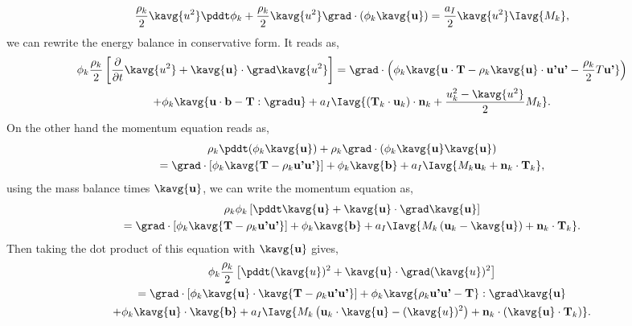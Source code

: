 \begin{equation*}
    \frac{\rho_k}{2} \kavg{u^2} \pddt \phi_k 
    + \frac{\rho_k}{2} \kavg{u^2} \grad \cdot\left(\phi_k\kavg{\textbf{u}}\right)
    = \frac{a_I}{2}\kavg{u^2}\Iavg{M_k},
\end{equation*}
we can rewrite the energy balance in conservative form. 
It reads as, 
\begin{multline}
    \phi_k\frac{\rho_k}{2}  \left[
        \frac{\partial }{\partial t}
        \kavg{u^2}
        +\kavg{\textbf{u}}\cdot\grad 
        \kavg{u^2}
    \right]
    =
    \grad\cdot\left(
        \phi_k
        \kavg{\textbf{u}\cdot \textbf{T}
        - \rho_k\kavg{\textbf{u}}\cdot\textbf{u'u'}
        - \frac{\rho_k}{2}T\textbf{u'}}
    \right)\\
    +\phi_k\kavg{\textbf{u}\cdot\textbf{b} - \textbf{T}: \grad\textbf{u}}
    +a_I \Iavg{
        (\textbf{T}_k\cdot\textbf{u}_k)\cdot\textbf{n}_k
        + \frac{u^2_k - \kavg{u^2}}{2} M_k}.
    \label{ap:eq:avg_k_u_2}
\end{multline}
On the other hand the momentum equation reads as, 
\begin{multline*}
    \rho_k\pddt (\phi_k\kavg{\textbf{u}}) 
    + \rho_k\grad\cdot(\phi_k\kavg{\textbf{u}}\kavg{\textbf{u}})\\
    = \grad\cdot\left[
        \phi_k \kavg{\textbf{T}
        - \rho_k \textbf{u'u'}}
    \right]
    +\phi_k\kavg{\textbf{b}}
    + a_I\Iavg{M_k \textbf{u}_k +\textbf{n}_k\cdot\textbf{T}_k},
\end{multline*}
using the mass balance times $\kavg{\textbf{u}}$, we can write the momentum equation as, 
\begin{multline*}
    \rho_k \phi_k \left[
        \pddt \kavg{\textbf{u}}
        + \kavg{\textbf{u}}\cdot\grad\kavg{\textbf{u}}
    \right]\\
    = \grad\cdot\left[
        \phi_k \kavg{\textbf{T}
        - \rho_k \textbf{u'u'}}
    \right]
    +\phi_k\kavg{\textbf{b}}
    + a_I\Iavg{M_k \left(\textbf{u}_k - \kavg{\textbf{u}}\right) +\textbf{n}_k\cdot\textbf{T}_k}.
\end{multline*}
Then taking the dot product of this equation with $\kavg{\textbf{u}}$ gives, 
\begin{multline}
    \phi_k\frac{\rho_k}{2}  \left[
        \pddt (\kavg{u})^2
        + \kavg{\textbf{u}}\cdot\grad(\kavg{u})^2
    \right]\\
    = \grad\cdot\left[
        \phi_k \kavg{\textbf{u}}\cdot\kavg{\textbf{T}
        - \rho_k  \textbf{u'u'}}
    \right]
    +\phi_k\kavg{\rho_k \textbf{u'u'} - \textbf{T}}:\grad
         \kavg{\textbf{u}}\\
    +\phi_k\kavg{\textbf{u}}\cdot\kavg{\textbf{b}}
    + a_I\Iavg{M_k \left(\textbf{u}_k\cdot\kavg{\textbf{u}} 
    - (\kavg{u})^2\right) +\textbf{n}_k\cdot(\kavg{\textbf{u}}\cdot\textbf{T}_k)}.
    \label{ap:eq:avg_k_u_u}
\end{multline}
